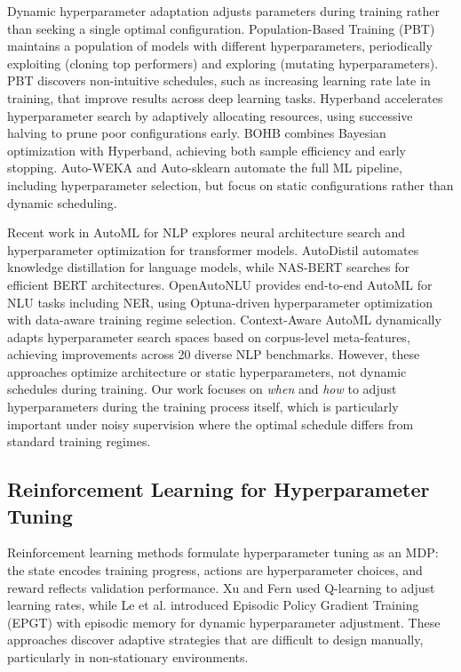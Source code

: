\documentclass[11pt]{article}
\begin{document}
Dynamic hyperparameter adaptation adjusts parameters during training rather than seeking a single optimal configuration. Population-Based Training (PBT) \cite{jaderberg2017population} maintains a population of models with different hyperparameters, periodically exploiting (cloning top performers) and exploring (mutating hyperparameters). PBT discovers non-intuitive schedules, such as increasing learning rate late in training, that improve results across deep learning tasks. Hyperband \cite{li2018hyperband} accelerates hyperparameter search by adaptively allocating resources, using successive halving to prune poor configurations early. BOHB \cite{falkner2018bohb} combines Bayesian optimization with Hyperband, achieving both sample efficiency and early stopping. Auto-WEKA \cite{feurer2015auto} and Auto-sklearn \cite{feurer2015auto} automate the full ML pipeline, including hyperparameter selection, but focus on static configurations rather than dynamic scheduling.

Recent work in AutoML for NLP explores neural architecture search and hyperparameter optimization for transformer models. AutoDistil \cite{chen2023autodistil} automates knowledge distillation for language models, while NAS-BERT \cite{xu2021nasbert} searches for efficient BERT architectures. OpenAutoNLU \cite{openautonlu2025} provides end-to-end AutoML for NLU tasks including NER, using Optuna-driven hyperparameter optimization with data-aware training regime selection. Context-Aware AutoML \cite{contextautoml2025} dynamically adapts hyperparameter search spaces based on corpus-level meta-features, achieving improvements across 20 diverse NLP benchmarks. However, these approaches optimize architecture or static hyperparameters, not dynamic schedules during training. Our work focuses on \textit{when} and \textit{how} to adjust hyperparameters during the training process itself, which is particularly important under noisy supervision where the optimal schedule differs from standard training regimes.

\subsection{Reinforcement Learning for Hyperparameter Tuning}

Reinforcement learning methods formulate hyperparameter tuning as an MDP: the state encodes training progress, actions are hyperparameter choices, and reward reflects validation performance. Xu and Fern \cite{xu2019learning} used Q-learning to adjust learning rates, while Le et al. \cite{le2022epgt} introduced Episodic Policy Gradient Training (EPGT) with episodic memory for dynamic hyperparameter adjustment. These approaches discover adaptive strategies that are difficult to design manually, particularly in non-stationary environments.
\end{document}
